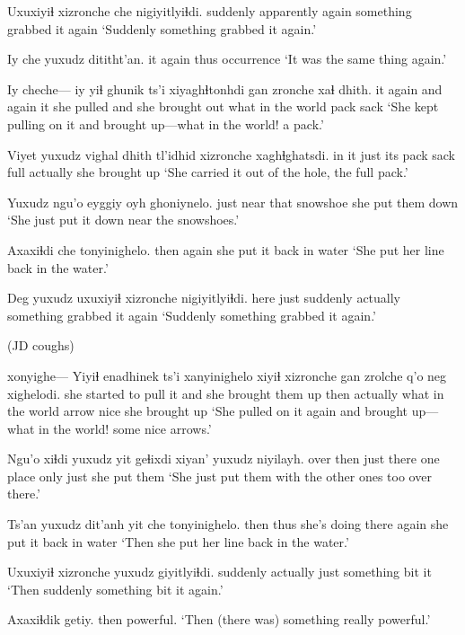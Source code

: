 \documentclass[12pt]{article}
\begin{document}
\gll Uxuxiyiɬ xizronche che nigiyitlyiɬdi.
suddenly        apparently again    {something grabbed it again}
\glt `Suddenly something grabbed it again.'
\glend

\gll Iy che yuxudz dititht'an. 
it again thus  {occurrence}
\glt `It was the same thing again.'
\glend

\gll Iy cheche--- iy {yiɬ ghunik} ts'i xiyaghɬtonhdi {gan zronche} {xaɬ dhith}.
it {again and again} it {she pulled} and {she brought out} {what in the world} {pack sack}
\glt `She kept pulling on it and brought up---what in the world! a pack.'
\glend

\gll Viyet yuxudz {vighal dhith} tl'idhid xizronche xaghɬghatsdi.
{in it} just   {its pack sack} full    actually  {she brought up}
\glt `She carried it out of the hole, the full pack.'
\glend

\gll Yuxudz ngu'o eyggiy oyh ghoniynelo.
just   near  that   snowshoe {she put them down}
\glt `She just put it down near the snowshoes.'
\glend

\gll Axaxiɬdi che tonyinighelo.
then   again {she put it back in water}
\glt `She put her line back in the water.'
\glend

\gll Deg yuxudz uxuxiyiɬ xizronche nigiyitlyiɬdi.
here just suddenly actually {something grabbed it again}
\glt `Suddenly something grabbed it again.'
\glend

(JD coughs)

\gll xonyighe--- {Yiyiɬ enadhinek} ts'i xanyinighelo xiyiɬ xizronche {gan zrolche} q'o neg xighelodi.
{} {she started to pull it} and {she brought them up} then actually {what in the world} arrow nice {she brought up}
\glt `She pulled on it again and brought up---what in the world! some nice arrows.'
\glend

\gll Ngu'o xiɬdi yuxudz yit geɬixdi xiyan' yuxudz niyilayh.
over  then  just  there {one place} only just {she put them}
\glt `She just put them with the other ones too over there.'
\glend

\gll Ts'an yuxudz dit'anh yit che tonyinighelo.
then  thus   {she's doing} there again  {she put it back in water}
\glt `Then she put her line back in the water.'
\glend

\gll Uxuxiyiɬ xizronche yuxudz giyitlyiɬdi.
suddenly actually  just  {something bit it}
\glt `Then suddenly something bit it again.'
\glend

\gll Axaxiɬdik getiy.
then      powerful.
\glt `Then (there was) something really powerful.'
\glend
\end{document}

